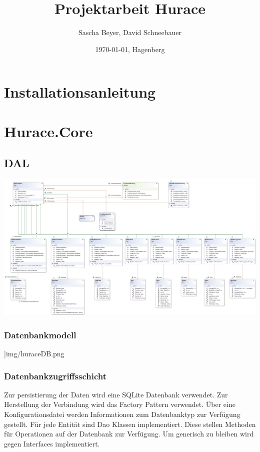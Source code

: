 \documentclass[a4paper, 12pt]{article}
\title{Projektarbeit Hurace}
\author{Sascha Beyer, David Schneebauer}
\date{\today{}, Hagenberg}
\begin{document}
	\maketitle
	\tableofcontents
	\newpage
	\section{Installationsanleitung}
	
	
	

	\section{Hurace.Core}
	\subsection{DAL}
	\includegraphics[width=.9\textwidth]{img/DAL.png}
	\subsubsection{Datenbankmodell}
	\textwidth]{img/huraceDB.png}
	\newpage
	\subsubsection{Datenbankzugriffsschicht}
	Zur persistierung der Daten wird eine SQLite Datenbank verwendet. Zur Herstellung der Verbindung wird das Factory Pattern verwendet. Über eine Konfigurationsdatei werden Informationen zum Datenbanktyp zur Verfügung gestellt. Für jede Entität sind Dao Klassen implementiert. Diese stellen Methoden für Operationen auf der Datenbank zur Verfügung. Um generisch zu bleiben wird gegen Interfaces implementiert.
	\newline
	 
\end{document}
